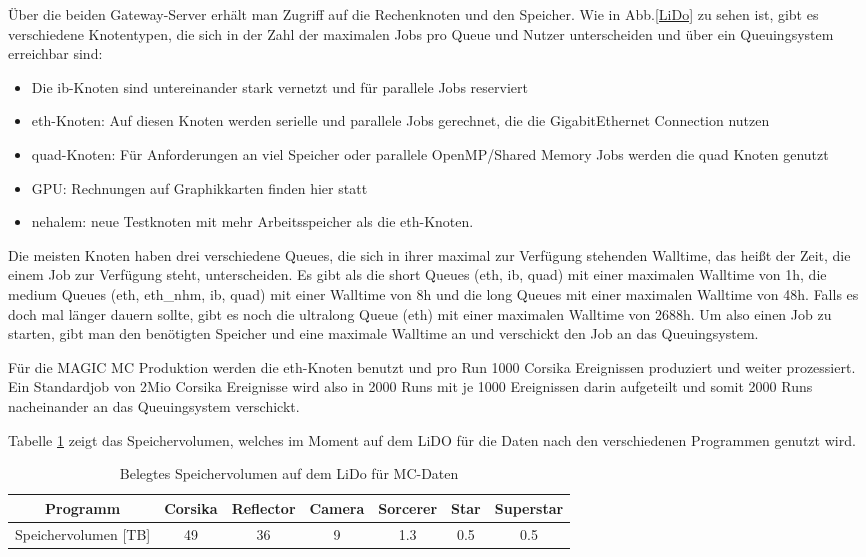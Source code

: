 Über die beiden Gateway-Server erhält man Zugriff auf die Rechenknoten und den Speicher.
Wie in Abb.\ref{LiDo} zu sehen ist, gibt es verschiedene Knotentypen, die sich in der Zahl der maximalen Jobs pro Queue und Nutzer unterscheiden und über ein Queuingsystem erreichbar sind:

\begin{itemize}
 \item Die ib-Knoten sind untereinander stark vernetzt und für parallele Jobs reserviert
 \item eth-Knoten: Auf diesen Knoten werden serielle und parallele Jobs gerechnet, die die GigabitEthernet Connection nutzen
 \item quad-Knoten: Für Anforderungen an viel Speicher oder parallele OpenMP/Shared Memory Jobs werden die quad Knoten genutzt
 \item GPU: Rechnungen auf Graphikkarten finden hier statt
 \item nehalem: neue Testknoten mit mehr Arbeitsspeicher als die eth-Knoten.
\end{itemize}

Die meisten Knoten haben drei verschiedene Queues, die sich in ihrer maximal zur Verfügung stehenden Walltime, das heißt der Zeit, die einem Job zur Verfügung steht, unterscheiden.
Es gibt als die short Queues (eth, ib, quad) mit einer maximalen Walltime von 1h, die medium Queues (eth, eth\_nhm, ib, quad) mit einer Walltime von 8h und die long Queues mit einer maximalen Walltime von 48h. 
Falls es doch mal länger dauern sollte, gibt es noch die ultralong Queue (eth) mit einer maximalen Walltime von 2688h.
Um also einen Job zu starten, gibt man den benötigten Speicher und eine maximale Walltime an und verschickt den Job an das Queuingsystem.

Für die MAGIC MC Produktion werden die eth-Knoten benutzt und pro Run 1000 Corsika Ereignissen produziert und weiter prozessiert. 
Ein Standardjob von 2Mio Corsika Ereignisse wird also in 2000 Runs mit je 1000 Ereignissen darin aufgeteilt und somit 2000 Runs nacheinander an das Queuingsystem verschickt.


Tabelle \ref{tab:LiDO} zeigt das Speichervolumen, welches im Moment auf dem LiDO für die Daten nach den verschiedenen Programmen genutzt wird.

\begin{table}[h!]
    \centering
    \caption{Belegtes Speichervolumen auf dem LiDo für MC-Daten}
    \label{tab:LiDO}
    \begin{tabular}{ccccccc}
        \toprule
        Programm & Corsika & Reflector & Camera & Sorcerer & Star & Superstar\\
        \midrule
        Speichervolumen [TB] & 49 & 36 & 9 & 1.3 & 0.5 & 0.5\\
        \bottomrule
    \end{tabular}
\end{table}

